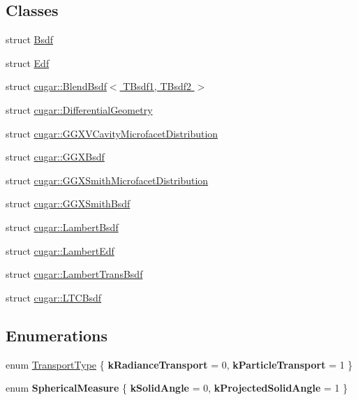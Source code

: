 \subsection*{Classes}
\begin{DoxyCompactItemize}
\item 
struct \hyperlink{struct_bsdf}{Bsdf}
\item 
struct \hyperlink{struct_edf}{Edf}
\item 
struct \hyperlink{structcugar_1_1_blend_bsdf}{cugar\+::\+Blend\+Bsdf$<$ T\+Bsdf1, T\+Bsdf2 $>$}
\item 
struct \hyperlink{structcugar_1_1_differential_geometry}{cugar\+::\+Differential\+Geometry}
\item 
struct \hyperlink{structcugar_1_1_g_g_x_v_cavity_microfacet_distribution}{cugar\+::\+G\+G\+X\+V\+Cavity\+Microfacet\+Distribution}
\item 
struct \hyperlink{structcugar_1_1_g_g_x_bsdf}{cugar\+::\+G\+G\+X\+Bsdf}
\item 
struct \hyperlink{structcugar_1_1_g_g_x_smith_microfacet_distribution}{cugar\+::\+G\+G\+X\+Smith\+Microfacet\+Distribution}
\item 
struct \hyperlink{structcugar_1_1_g_g_x_smith_bsdf}{cugar\+::\+G\+G\+X\+Smith\+Bsdf}
\item 
struct \hyperlink{structcugar_1_1_lambert_bsdf}{cugar\+::\+Lambert\+Bsdf}
\item 
struct \hyperlink{structcugar_1_1_lambert_edf}{cugar\+::\+Lambert\+Edf}
\item 
struct \hyperlink{structcugar_1_1_lambert_trans_bsdf}{cugar\+::\+Lambert\+Trans\+Bsdf}
\item 
struct \hyperlink{structcugar_1_1_l_t_c_bsdf}{cugar\+::\+L\+T\+C\+Bsdf}
\end{DoxyCompactItemize}
\subsection*{Enumerations}
\begin{DoxyCompactItemize}
\item 
enum \hyperlink{group___b_s_d_f_module_gaca1e72535e7f260e54ed8bbf984dade9}{Transport\+Type} \{ {\bfseries k\+Radiance\+Transport} = 0, 
{\bfseries k\+Particle\+Transport} = 1
 \}
\item 
\mbox{\label{group___b_s_d_f_module_ga31d5c3496d9630777d98ec49f397cbfd}} 
enum {\bfseries Spherical\+Measure} \{ {\bfseries k\+Solid\+Angle} = 0, 
{\bfseries k\+Projected\+Solid\+Angle} = 1
 \}
\end{DoxyCompactItemize}
